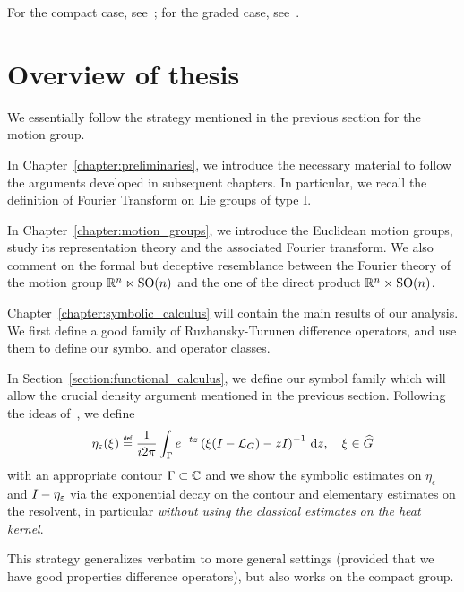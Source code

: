 For the compact case,
see~\cite[Sections 6.3 and 7.3]{Fischer2015};
for the graded case,
see~\cite[Sections 5.4 and 5.5]{FischerRuzhansky16}.

\section{Overview of thesis}

We essentially follow the strategy mentioned in the previous section for the motion group.

In Chapter~\ref{chapter:preliminaries},
we introduce the necessary material to follow the arguments developed in subsequent chapters.
In particular, we recall the definition of Fourier Transform on Lie groups of type I.

In Chapter~\ref{chapter:motion_groups},
we introduce the Euclidean motion groups,
study its representation theory and the associated Fourier transform.
We also comment on the formal but deceptive resemblance between the Fourier theory of the motion group $\mathbb{R}^n \ltimes {\mathrm{SO} (n)}$
and the one of the direct product $\mathbb{R}^n \times {\mathrm{SO} (n)}$.

Chapter~\ref{chapter:symbolic_calculus} will contain the main results of our analysis.
We first define a good family of Ruzhansky-Turunen difference operators,
and use them to define our symbol and operator classes.

In Section~\ref{section:functional_calculus},
we define our symbol family which will allow the crucial density argument mentioned in the previous section.
Following the ideas of~\cite{Shubin01, RuzhanskyWirth14},
we define
\begin{align*}
    \eta_\epsilon(\xi) \defeq
    \frac 1 {\i \turn} \int_\Gamma \e^{-t z} \left(\xi(\Id {} - \Laplacian) - z \Id {}\right)^{-1} \dd z,
    \quad \xi \in \dualGroup \Group
\end{align*}
with an appropriate contour $\Gamma \subset \mathbb{C}$
and we show the symbolic estimates on $\eta_\epsilon$ and ${I_{}} - \eta_\varepsilon$
via the exponential decay on the contour and elementary estimates on the resolvent,
in particular \emph{without using the classical estimates on the heat kernel}.

This strategy generalizes verbatim to more general settings
(provided that we have good properties difference operators),
but also works on the compact group.

